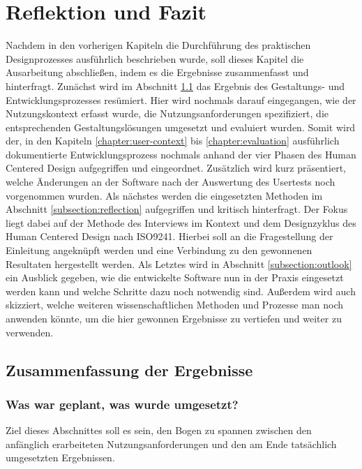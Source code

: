 \chapter{Reflektion und Fazit}
\label{chapter:conclusion}

Nachdem in den vorherigen Kapiteln die Durchführung des praktischen
Designprozesses ausführlich beschrieben wurde, soll dieses Kapitel die
Ausarbeitung abschließen, indem es die Ergebnisse zusammenfasst und
hinterfragt. Zunächst wird im Abschnitt \ref{subsection:resultDescription} das
Ergebnis des Gestaltungs- und Entwicklungsprozesses resümiert. Hier wird
nochmals darauf eingegangen, wie der Nutzungskontext erfasst wurde, die
Nutzungsanforderungen spezifiziert, die entsprechenden Gestaltungslösungen
umgesetzt und evaluiert wurden. Somit wird der, in den Kapiteln
\ref{chapter:user-context} bis \ref{chapter:evaluation} ausführlich
dokumentierte Entwicklungsprozess nochmals anhand der vier Phasen des Human
Centered Design aufgegriffen und eingeordnet\cite{ISO9241}. Zusätzlich wird
kurz präsentiert, welche Änderungen an der Software nach der Auswertung des
Usertests noch vorgenommen wurden. Als nächstes werden die eingesetzten
Methoden im Abschnitt \ref{subsection:reflection} aufgegriffen und kritisch
hinterfragt. Der Fokus liegt dabei auf der Methode des Interviews im Kontext
und dem Designzyklus des Human Centered Design nach ISO9241. Hierbei soll an
die Fragestellung der Einleitung angeknüpft werden und eine Verbindung zu den
gewonnenen Resultaten hergestellt werden. Als Letztes wird in Abschnitt
\ref{subsection:outlook} ein Ausblick gegeben, wie die entwickelte Software nun
in der Praxis eingesetzt werden kann und welche Schritte dazu noch notwendig
sind. Außerdem wird auch skizziert, welche weiteren wissenschaftlichen Methoden
und Prozesse man noch anwenden könnte, um die hier gewonnen Ergebnisse zu
vertiefen und weiter zu verwenden.

\section{Zusammenfassung der Ergebnisse}
\label{subsection:resultDescription}

\subsection*{Was war geplant, was wurde umgesetzt?}
Ziel dieses Abschnittes soll es sein, den Bogen zu spannen zwischen den
anfänglich erarbeiteten Nutzungsanforderungen und den am Ende tatsächlich
umgesetzten Ergebnissen.

